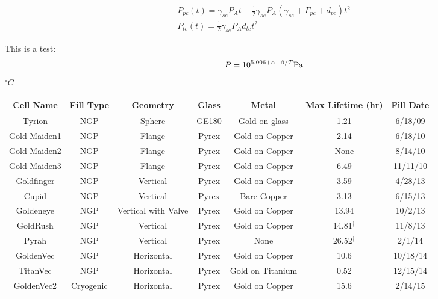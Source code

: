 \documentclass[pdftex,letterpaper,12pt]{report}
\begin{document}
	
\begin{subequations}\label{InitialSpinup}
	\begin{gather}
	P_{pc}(t)=\gamma_{se}P_{A}t-\frac{1}{2}\gamma_{se}P_{A}(\gamma_{se}+\Gamma_{pc}+d_{pc})t^{2}\\
	P_{tc}(t)=\frac{1}{2}\gamma_{se}P_{A}d_{tc}t^{2}
	\end{gather}
\end{subequations}

This is a test:
\begin{equation}
P=10^{5.006+\alpha + \beta/T} {\rm Pa}
\end{equation}
$^{\circ}C$

\begin{table}\scriptsize
	\captionsetup{font=scriptsize}
	\begin{center}
		\def\arraystretch{0.75}
		\setlength\tabcolsep{2pt}
		\begin{tabular}{|c|c|c|c|c|c|c|}
			\hline
			Cell Name & Fill Type & Geometry & Glass & Metal & Max Lifetime (hr) & Fill Date\\ \hline
			Tyrion & NGP & Sphere & GE180 & Gold on glass & 1.21 & 6/18/09 \\ \hline
			Gold Maiden1 & NGP & Flange & Pyrex & Gold on Copper & 2.14 & 6/18/10 \\ \hline
			Gold Maiden2 & NGP & Flange & Pyrex & Gold on Copper & None & 8/14/10\\ \hline
			Gold Maiden3 & NGP & Flange & Pyrex & Gold on Copper & 6.49 & 11/11/10\\ \hline
			Goldfinger & NGP & Vertical & Pyrex & Gold on Copper & 3.59 & 4/28/13\\ \hline
			Cupid & NGP & Vertical & Pyrex & Bare Copper & 3.13 & 6/15/13\\ \hline
			Goldeneye & NGP & Vertical with Valve & Pyrex & Gold on Copper & 13.94 & 10/2/13\\ \hline
			GoldRush & NGP & Vertical & Pyrex & Gold on Copper & 14.81$^\dagger$  & 11/8/13\\ \hline
			Pyrah & NGP & Vertical & Pyrex & None & 26.52$^\dagger$ & 2/1/14\\ \hline
			GoldenVec & NGP & Horizontal & Pyrex & Gold on Copper & 10.6 & 10/18/14\\ \hline
			TitanVec & NGP & Horizontal & Pyrex & Gold on Titanium & 0.52 & 12/15/14\\ \hline
			GoldenVec2 & Cryogenic & Horizontal & Pyrex & Gold on Copper & 15.6 & 2/14/15\\ \hline

\end{tabular}
\end{center}
\end{table}
\end{document}
